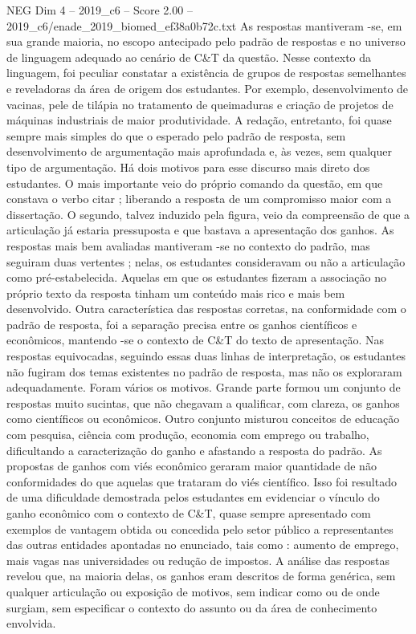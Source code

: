 \begin{textsample}{NEG Dim 4 – 2019\_c6 – Score 2.00 – 2019\_c6/enade\_2019\_biomed\_ef38a0b72c.txt}
As respostas mantiveram -se, em sua grande maioria, no escopo antecipado pelo padrão de respostas e no universo de linguagem adequado ao cenário de C\&T da questão.
Nesse contexto da linguagem, foi peculiar constatar a existência de grupos de respostas semelhantes e reveladoras da área de origem dos estudantes.
Por exemplo, desenvolvimento de vacinas, pele de tilápia no tratamento de queimaduras e criação de projetos de máquinas industriais de maior produtividade.
A redação, entretanto, foi quase sempre mais simples do que o esperado pelo padrão de resposta, sem desenvolvimento de argumentação mais aprofundada e, às vezes, sem qualquer tipo de argumentação.
Há dois motivos para esse discurso mais direto dos estudantes.
O mais importante veio do próprio comando da questão, em que constava o verbo citar ; liberando a resposta de um compromisso maior com a dissertação.
O segundo, talvez induzido pela figura, veio da compreensão de que a articulação já estaria pressuposta e que bastava a apresentação dos ganhos.
As respostas mais bem avaliadas mantiveram -se no contexto do padrão, mas seguiram duas vertentes ; nelas, os estudantes consideravam ou não a articulação como pré-estabelecida.
Aquelas em que os estudantes fizeram a associação no próprio texto da resposta tinham um conteúdo mais rico e mais bem desenvolvido.
Outra característica das respostas corretas, na conformidade com o padrão de resposta, foi a separação precisa entre os ganhos científicos e econômicos, mantendo -se o contexto de C\&T do texto de apresentação.
Nas respostas equivocadas, seguindo essas duas linhas de interpretação, os estudantes não fugiram dos temas existentes no padrão de resposta, mas não os exploraram adequadamente.
Foram vários os motivos.
Grande parte formou um conjunto de respostas muito sucintas, que não chegavam a qualificar, com clareza, os ganhos como científicos ou econômicos.
Outro conjunto misturou conceitos de educação com pesquisa, ciência com produção, economia com emprego ou trabalho, dificultando a caracterização do ganho e afastando a resposta do padrão.
As propostas de ganhos com viés econômico geraram maior quantidade de não conformidades do que aquelas que trataram do viés científico.
Isso foi resultado de uma dificuldade demostrada pelos estudantes em evidenciar o vínculo do ganho econômico com o contexto de C\&T, quase sempre apresentado com exemplos de vantagem obtida ou concedida pelo setor público a representantes das outras entidades apontadas no enunciado, tais como : aumento de emprego, mais vagas nas universidades ou redução de impostos.
A análise das respostas revelou que, na maioria delas, os ganhos eram descritos de forma genérica, sem qualquer articulação ou exposição de motivos, sem indicar como ou de onde surgiam, sem especificar o contexto do assunto ou da área de conhecimento envolvida.

\end{textsample}
